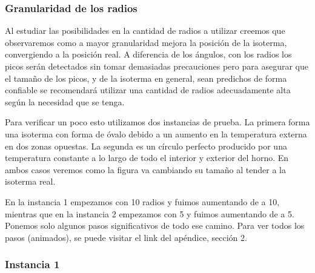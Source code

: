 \subsubsection{Granularidad de los radios}
Al estudiar las posibilidades en la cantidad de radios a utilizar creemos que observaremos como a mayor granularidad mejora la posición de la isoterma, convergiendo a la posición real. A diferencia de los ángulos, con los radios los picos serán detectados sin tomar demasiadas precauciones pero para asegurar que el tamaño de los picos, y de la isoterma en general, sean predichos de forma confiable se recomendará utilizar una cantidad de radios adecuadamente alta según la necesidad que se tenga.

Para verificar un poco esto utilizamos dos instancias de prueba. La primera forma una isoterma con forma de óvalo debido a un aumento en la temperatura externa en dos zonas opuestas. La segunda es un círculo perfecto producido por una temperatura constante a lo largo de todo el interior y exterior del horno. En ambos casos veremos como la figura va cambiando su tamaño al tender a la isoterma real.

En la instancia 1 empezamos con 10 radios y fuimos aumentando de a 10, mientras que en la instancia 2 empezamos con 5 y fuimos aumentando de a 5. Ponemos solo algunos pasos significativos de todo ese camino. Para ver todos los pasos (animados), se puede visitar el link del apéndice, sección 2.

\subsubsection*{Instancia 1}


